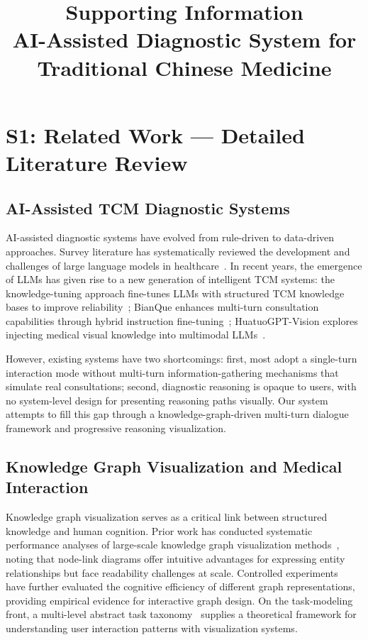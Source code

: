 \documentclass[12pt]{article}
\title{Supporting Information\\
\large AI-Assisted Diagnostic System for Traditional Chinese Medicine}
\date{}
\begin{document}
\maketitle
\tableofcontents
\newpage

\section{S1: Related Work --- Detailed Literature Review}
\label{sec:si-related-work}

\subsection{AI-Assisted TCM Diagnostic Systems}

AI-assisted diagnostic systems have evolved from rule-driven to data-driven approaches. Survey literature has systematically reviewed the development and challenges of large language models in healthcare~\cite{7,14,8}. In recent years, the emergence of LLMs has given rise to a new generation of intelligent TCM systems: the knowledge-tuning approach fine-tunes LLMs with structured TCM knowledge bases to improve reliability~\cite{60}; BianQue enhances multi-turn consultation capabilities through hybrid instruction fine-tuning~\cite{61}; HuatuoGPT-Vision explores injecting medical visual knowledge into multimodal LLMs~\cite{62}.

However, existing systems have two shortcomings: first, most adopt a single-turn interaction mode without multi-turn information-gathering mechanisms that simulate real consultations; second, diagnostic reasoning is opaque to users, with no system-level design for presenting reasoning paths visually. Our system attempts to fill this gap through a knowledge-graph-driven multi-turn dialogue framework and progressive reasoning visualization.

\subsection{Knowledge Graph Visualization and Medical Interaction}

Knowledge graph visualization serves as a critical link between structured knowledge and human cognition. Prior work has conducted systematic performance analyses of large-scale knowledge graph visualization methods~\cite{24}, noting that node-link diagrams offer intuitive advantages for expressing entity relationships but face readability challenges at scale. Controlled experiments~\cite{34} have further evaluated the cognitive efficiency of different graph representations, providing empirical evidence for interactive graph design. On the task-modeling front, a multi-level abstract task taxonomy~\cite{33} supplies a theoretical framework for understanding user interaction patterns with visualization systems.
\end{document}
